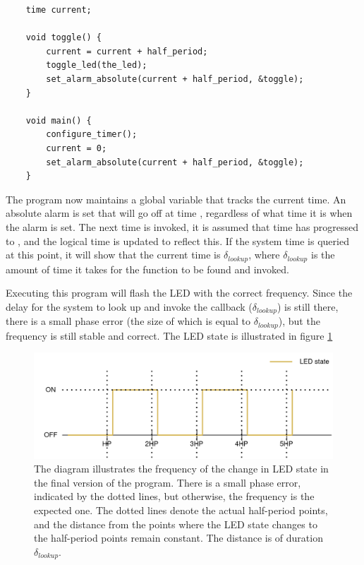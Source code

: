 \begin{verbatim}
    time current;

    void toggle() {
        current = current + half_period;
        toggle_led(the_led);
        set_alarm_absolute(current + half_period, &toggle);
    }

    void main() {
        configure_timer();
        current = 0;
        set_alarm_absolute(current + half_period, &toggle);
    }
\end{verbatim}

The program now maintains a global variable that tracks the current time. An absolute alarm is set that will go off at
time , regardless of what time it is when the alarm is set. The next time 
is invoked, it is assumed that time has progressed to , and the logical time is updated
to reflect this. If the system time is queried at this point, it will show that the current time is 
 $\delta_{lookup}$, where $\delta_{lookup}$ is the amount of time it takes for the
 function to be found and invoked.

Executing this program will flash the LED with the correct frequency. Since the delay for the system to look up and
invoke the callback ($\delta_{lookup}$) is still there, there is a small phase error (the size of which is equal to
$\delta_{lookup}$), but the frequency is still stable and correct. The LED state is illustrated in figure \ref{graphics:phase-error}

\begin{figure}
    \centering
    \includegraphics[scale=0.2]{graphics/phase-error.png}
    \caption{The diagram illustrates the frequency of the change in LED state in the final version of the program.
    There is a small phase error, indicated by the dotted lines, but otherwise, the frequency is the expected one.
    The dotted lines denote the actual half-period points, and the distance from the points where the LED state
    changes to the half-period points remain constant. The distance is of duration $\delta_{lookup}$.}
    \label{graphics:phase-error}
\end{figure}


